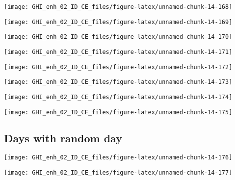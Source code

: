 \documentclass[
  10pt,
  a4paper,oneside]{article}
\begin{document}
\begin{center}\texttt{[image: GHI\_enh\_02\_ID\_CE\_files/figure-latex/unnamed-chunk-14-168]} \end{center}

\begin{center}\texttt{[image: GHI\_enh\_02\_ID\_CE\_files/figure-latex/unnamed-chunk-14-169]} \end{center}

\begin{center}\texttt{[image: GHI\_enh\_02\_ID\_CE\_files/figure-latex/unnamed-chunk-14-170]} \end{center}

\begin{center}\texttt{[image: GHI\_enh\_02\_ID\_CE\_files/figure-latex/unnamed-chunk-14-171]} \end{center}

\begin{center}\texttt{[image: GHI\_enh\_02\_ID\_CE\_files/figure-latex/unnamed-chunk-14-172]} \end{center}

\begin{center}\texttt{[image: GHI\_enh\_02\_ID\_CE\_files/figure-latex/unnamed-chunk-14-173]} \end{center}

\begin{center}\texttt{[image: GHI\_enh\_02\_ID\_CE\_files/figure-latex/unnamed-chunk-14-174]} \end{center}

\begin{center}\texttt{[image: GHI\_enh\_02\_ID\_CE\_files/figure-latex/unnamed-chunk-14-175]} \end{center}

\FloatBarrier

\hypertarget{days-with-random-day}{%
\subsection{Days with random day}\label{days-with-random-day}}

\begin{center}\texttt{[image: GHI\_enh\_02\_ID\_CE\_files/figure-latex/unnamed-chunk-14-176]} \end{center}

\begin{center}\texttt{[image: GHI\_enh\_02\_ID\_CE\_files/figure-latex/unnamed-chunk-14-177]} \end{center}
\end{document}
